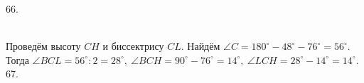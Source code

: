 \documentclass[12pt]{article}
\begin{document}
66. \begin{figure}[ht!]
\end{figure}\\
Проведём высоту $CH$ и биссектрису $CL.$ Найдём $\angle C=180^\circ-48^\circ-76^\circ=56^\circ.$ Тогда $\angle BCL=56^\circ:2=28^\circ,\ \angle BCH=90^\circ-76^\circ=14^\circ,\ \angle LCH=28^\circ-14^\circ=14^\circ.$\\
67. \begin{figure}[ht!]
\end{figure}\\
\end{document}
